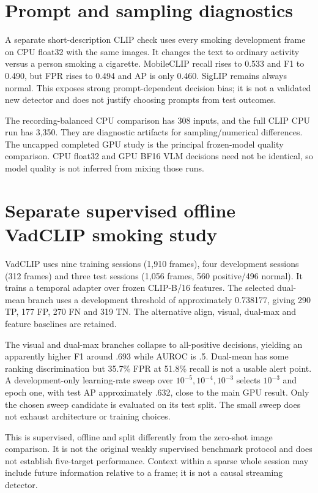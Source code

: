 \section{Prompt and sampling diagnostics}
A separate short-description CLIP check uses every smoking development frame on CPU float32 with the same images. It changes the text to ordinary activity versus a person smoking a cigarette. MobileCLIP recall rises to 0.533 and F1 to 0.490, but FPR rises to 0.494 and AP is only 0.460. SigLIP remains always normal. This exposes strong prompt-dependent decision bias; it is not a validated new detector and does not justify choosing prompts from test outcomes.

The recording-balanced CPU comparison has 308 inputs, and the full CLIP CPU run has 3,350. They are diagnostic artifacts for sampling/numerical differences. The uncapped completed GPU study is the principal frozen-model quality comparison. CPU float32 and GPU BF16 VLM decisions need not be identical, so model quality is not inferred from mixing those runs.

\section{Separate supervised offline VadCLIP smoking study}
VadCLIP uses nine training sessions (1,910 frames), four development sessions (312 frames) and three test sessions (1,056 frames, 560 positive/496 normal). It trains a temporal adapter over frozen CLIP-B/16 features. The selected dual-mean branch uses a development threshold of approximately 0.738177, giving 290 TP, 177 FP, 270 FN and 319 TN. The alternative align, visual, dual-max and feature baselines are retained.

The visual and dual-max branches collapse to all-positive decisions, yielding an apparently higher F1 around .693 while AUROC is .5. Dual-mean has some ranking discrimination but 35.7\% FPR at 51.8\% recall is not a usable alert point. A development-only learning-rate sweep over $10^{-5},10^{-4},10^{-3}$ selects $10^{-3}$ and epoch one, with test AP approximately .632, close to the main GPU result. Only the chosen sweep candidate is evaluated on its test split. The small sweep does not exhaust architecture or training choices.

This is supervised, offline and split differently from the zero-shot image comparison. It is not the original weakly supervised benchmark protocol and does not establish five-target performance. Context within a sparse whole session may include future information relative to a frame; it is not a causal streaming detector.


